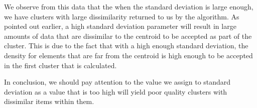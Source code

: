\documentclass[letterpaper,12pt]{article}
\begin{document}

We observe from this data that the when the standard deviation is large enough, we have clusters with large dissimilarity returned to us by the algorithm. As pointed out earlier, a high standard deviation parameter will result in large amounts of data that are dissimilar to the centroid to be accepted as part of the cluster. This is due to the fact that with  a high enough standard deviation, the density for elements that are far from the centroid is high enough to be accepted in the first cluster that is calculated.

In conclusion, we should pay attention to the value we assign to standard deviation as a value that is too high will yield poor quality clusters with dissimilar items within them.
\end{document}
